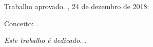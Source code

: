 \documentclass[
	12pt,				%
	openright,			%
	oneside,			%
	a4paper,			%
	english,			%
	brazil				%
	]{abntex2}
\begin{document}
%
% 
%
\begin{folhadeaprovacao}

  \begin{center}
    {\ABNTEXchapterfont\large\imprimirautor}

    \vspace*{\fill}\vspace*{\fill}
    \begin{center}
      \ABNTEXchapterfont\bfseries\Large\imprimirtitulo
    \end{center}
    \vspace*{\fill}
    
    \hspace{.45\textwidth}
    \begin{minipage}{.5\textwidth}
        \imprimirpreambulo
    \end{minipage}%
    \vspace*{\fill}
   \end{center}
        
   Trabalho aprovado. \imprimirlocal, 24 de dezembro de 2018:

   Conceito: .
   
      
   \begin{center}
    \vspace*{0.5cm}
    {\large\imprimirlocal}
    \par
    {\large\imprimirdata}
    \vspace*{1cm}
  \end{center}
  
\end{folhadeaprovacao}

\begin{dedicatoria}
   \vspace*{\fill}
   \centering
   \noindent
   \textit{ Este trabalho é dedicado...} \vspace*{\fill}
\end{dedicatoria}
\end{document}
